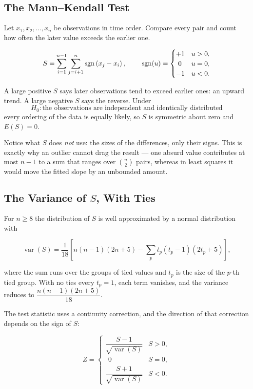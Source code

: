 \documentclass[11pt,a4paper]{article}
\theoremstyle{definition}
\begin{document}
\subsection{The Mann--Kendall Test}

Let $x_1, x_2, \ldots, x_n$ be observations in time order. Compare every pair and
count how often the later value exceeds the earlier one.

$$S = \sum^{n-1}_{i=1}\sum^{n}_{j=i+1}\operatorname{sgn}\left(x_j - x_i\right),
\hspace{0.8cm}
\operatorname{sgn}(u) = \begin{cases}
+1 & u > 0,\\
\ 0 & u = 0,\\
-1 & u < 0.
\end{cases}$$

A large positive $S$ says later observations tend to exceed earlier ones: an
upward trend. A large negative $S$ says the reverse. Under
$$H_0: \text{the observations are independent and identically distributed}$$
every ordering of the data is equally likely, so $S$ is symmetric about zero and
$E(S) = 0$.

Notice what $S$ does \emph{not} use: the sizes of the differences, only their
signs. This is exactly why an outlier cannot drag the result --- one absurd value
contributes at most $n-1$ to a sum that ranges over $\binom{n}{2}$ pairs, whereas
in least squares it would move the fitted slope by an unbounded amount.

\subsection{The Variance of $S$, With Ties}

For $n \geq 8$ the distribution of $S$ is well approximated by a normal
distribution with

$$\operatorname{var}(S) = \dfrac{1}{18}\left[
n(n-1)(2n+5) - \sum_{p} t_p\left(t_p - 1\right)\left(2t_p + 5\right)\right],$$

where the sum runs over the groups of tied values and $t_p$ is the size of the
$p$-th tied group. With no ties every $t_p = 1$, each term vanishes, and the
variance reduces to $\dfrac{n(n-1)(2n+5)}{18}$.

The test statistic uses a continuity correction, and the direction of that
correction depends on the sign of $S$:

$$Z = \begin{cases}
\dfrac{S - 1}{\sqrt{\operatorname{var}(S)}} & S > 0,\\[10pt]
\ \ 0 & S = 0,\\[6pt]
\dfrac{S + 1}{\sqrt{\operatorname{var}(S)}} & S < 0.
\end{cases}$$
\end{document}
